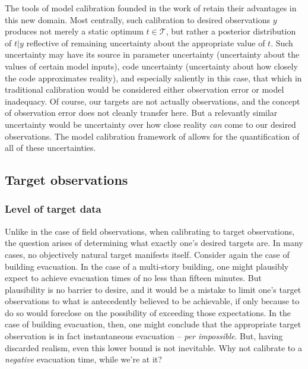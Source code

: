 \documentclass{article}
\begin{document}
The tools of model calibration founded in the work of \cite{Kennedy2001} retain their advantages in this new domain. Most centrally, such calibration to desired observations $y$ produces not merely a static optimum $t\in\mathcal T$, but rather a posterior distribution of $t|y$ reflective of remaining uncertainty about the appropriate value of $t$. Such uncertainty may have its source in parameter uncertainty (uncertainty about the values of certain model inputs), code uncertainty (uncertainty about how closely the code approximates reality), and especially saliently in this case, that which in traditional calibration would be considered either observation error or model inadequacy. Of course, our targets are not actually observations, and the concept of observation error does not cleanly transfer here. 
But a relevantly similar uncertainty would be uncertainty over how close reality \emph{can} come to our desired observations. 
The model calibration framework of \cite{Kennedy2001} allows for the quantification of all of these uncertainties.

\subsection{Target observations}


\subsubsection{Level of target data}\label{level_of_desired_data}
Unlike in the case of field observations, when calibrating to target observations, the question arises of determining what exactly one's desired targets are. In many cases, no objectively natural target manifests itself. Consider again the case of building evacuation. In the case of a multi-story building, one might plausibly expect to achieve evacuation times of no less than fifteen minutes. But plausibility is no barrier to desire, and it would be a mistake to limit one's target observations to what is antecedently believed to be achievable, if only because to do so would foreclose on the possibility of exceeding those expectations. In the case of building evacuation, then, one might conclude that the appropriate target observation is in fact instantaneous evacuation -- \textit{per impossible}. But, having discarded realism, even this lower bound is not inevitable. Why not calibrate to a \emph{negative} evacuation time, while we're at it?
\end{document}

